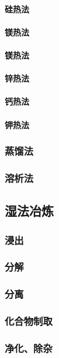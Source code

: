 \documentclass[UTF8]{../../ApplicationUniverse}
\begin{document}
            \paragraph{硅热法}
            \paragraph{镁热法}
            \paragraph{镁热法}
            \paragraph{锌热法}
            \paragraph{钙热法}
            \paragraph{钾热法}
        \subsubsection{蒸馏法}
        \subsubsection{溶析法}
    \subsection{湿法冶炼}
        \subsubsection{浸出}
        \subsubsection{分解}
        \subsubsection{分离}
        \subsubsection{化合物制取}
        \subsubsection{净化、除杂}
\end{document}
